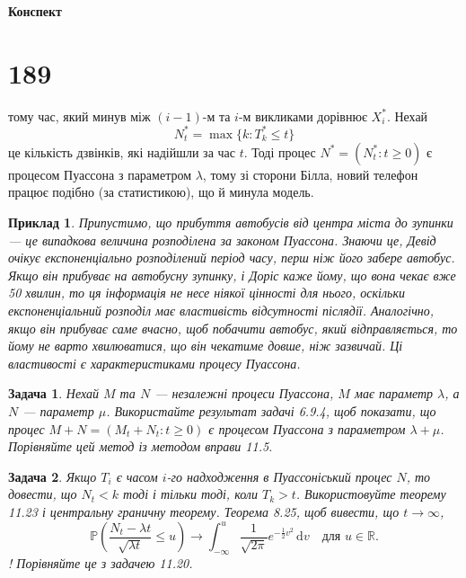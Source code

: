 \documentclass[12pt,fleqn]{article}
\newtheorem{example}{Приклад}[section]
\newtheorem{problem}{Задача}[section]
\numberwithin{figure}{section}
\numberwithin{equation}{section}
\begin{document}
\vspace{50mm}

\begin{center}
\Large\bf
Конспект\\[50mm]
{\Huge}
\end{center}

\vspace{50mm}

\newpage

\tableofcontents


\newpage


\section{189}\label{189}\allowdisplaybreaks

тому час, який минув між $(i-1)$-м та $i$-м викликами дорівнює $X_{i}^{*}$. Нехай
$$N_{t}^{*}=\max\{k: T_{k}^{*}\leq t\}$$
це кількість дзвінків, які надійшли за час $t$. Тоді процес $N^{*}=(N_{t}^{*}:t\geq 0)$ є процесом Пуассона з параметром $\lambda$, тому зі сторони Білла, новий телефон працює подібно (за статистикою), що й минула модель.

\begin{example}
    Припустимо, що прибуття автобусів від центра міста до зупинки --- це випадкова величина розподілена за законом Пуассона. Знаючи це, Девід  очікує експоненціально розподілений період часу, перш ніж його забере автобус.  Якщо він прибуває на автобусну зупинку, і Доріс  каже йому, що вона чекає вже 50 хвилин, то ця інформація не несе ніякої цінності для нього, оскільки експоненціальний розподіл має властивість відсутності післядії. Аналогічно, якщо він прибуває саме вчасно, щоб побачити автобус, який відправляється, то йому не варто хвилюватися, що він чекатиме довше, ніж зазвичай. Ці властивості є характеристиками процесу Пуассона.
\end{example}

\begin{problem}
     Нехай $M$ та $N$ --- незалежні процеси Пуассона, $M$ має параметр $\lambda$, а $N$ --- параметр $\mu$. Використайте результат задачі 6.9.4, щоб показати, що процес $M + N = (M_t + N_t : t \geq 0)$ є процесом Пуассона з параметром $\lambda + \mu$. Порівняйте цей метод із методом вправи 11.5.
\end{problem}

\begin{problem}
  Якщо $T_i$ є часом $i$-го надходження в Пуассоніський процес $N$, то довести, що $N_t < k$ тоді і тільки тоді, коли $T_k > t$. Використовуйте теорему 11.23 і центральну граничну теорему. Теорема 8.25, щоб вивести, що $t \rightarrow \infty$,
  $$ \mathbb{P}(\frac{N_t-\lambda t}{\sqrt{\lambda t}}\leq u)\rightarrow \int_{-\infty}^{u}\frac{1}{\sqrt{2\pi}}e^{-\frac{1}{2}v^2}\, \mathrm{d}v \quad \text{для $u \in \mathbb{R}.$} $$
  !
  Порівняйте це з задачею 11.20.
\end{problem}
\end{document}
